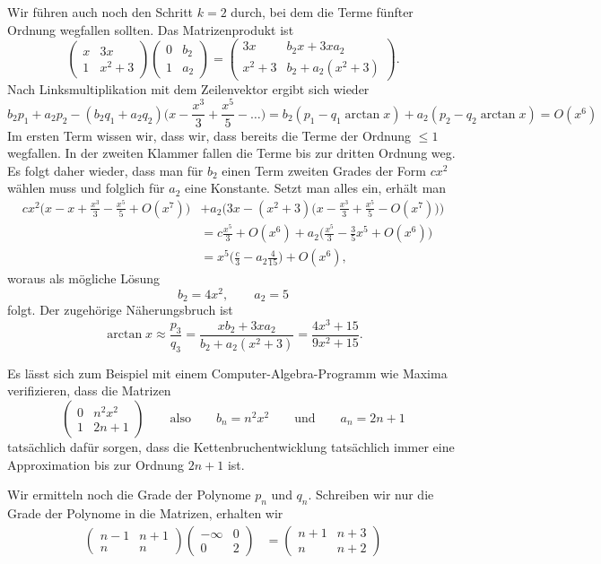 \begin{refsection}
Wir führen auch noch den Schritt $k=2$ durch, bei dem die Terme fünfter
Ordnung wegfallen sollten.
Das Matrizenprodukt ist
\[
\begin{pmatrix}
x&3x\\
1&x^2+3
\end{pmatrix}
\begin{pmatrix}
0&b_2\\
1&a_2
\end{pmatrix}
=
\begin{pmatrix}
3x    & b_2x + 3xa_2 \\
x^2+3 & b_2 + a_2(x^2+3)
\end{pmatrix}.
\]
Nach Linksmultiplikation mit dem Zeilenvektor ergibt sich wieder
\[
b_2p_1 + a_2p_2 - (b_2q_1+a_2q_2)
\biggl(x-\frac{x^3}{3} +\frac{x^5}5-\dots\biggr)
=
b_2(p_1-q_1 \arctan x)
+ a_2(p_2 - q_2\arctan x)
=
O(x^6)
\]
Im ersten Term wissen wir, dass wir, dass bereits die Terme der
Ordnung $\le 1$ wegfallen.
In der zweiten Klammer fallen die Terme bis zur dritten Ordnung weg.
Es folgt daher wieder, dass man für $b_2$ einen Term zweiten Grades
der Form $cx^2$ wählen muss und folglich für $a_2$ eine Konstante.
Setzt man alles ein, erhält man
\begin{align*}
cx^2\biggl(x- x+\frac{x^3}3-\frac{x^5}5+O(x^7)\biggr)
&+
a_2\biggl(3x -(x^2+3)\biggl(x-\frac{x^3}3+\frac{x^5}5-O(x^7)\biggr)\biggr)
\\
&=
c\frac{x^5}{3}
+O(x^6)
+a_2
\biggl(\frac{x^5}{3}-\frac{3}{5}x^5+O(x^6)\biggr)
\\
&=x^5\biggl(\frac{c}3-a_2\frac{4}{15}\biggr) + O(x^6),
\end{align*}
woraus als mögliche Lösung
\[
b_2=4x^2,\qquad
a_2=5
\]
folgt.
Der zugehörige Näherungsbruch ist
\[
\arctan x
\approx
\frac{p_3}{q_3}
=
\frac{xb_2+3xa_2}{b_2+a_2(x^2+3)}
=
\frac{4x^3+15}{9x^2+15}.
\]

Es lässt sich zum Beispiel mit einem Computer-Algebra-Programm wie
Maxima verifizieren, dass die Matrizen
\[
\begin{pmatrix}
0&n^2x^2\\
1&2n+1
\end{pmatrix}
\qquad\text{also}\qquad
b_n=n^2x^2\qquad\text{und}\qquad a_n=2n+1
\]
tatsächlich dafür sorgen, dass die Kettenbruchentwicklung tatsächlich
immer eine Approximation bis zur Ordnung $2n+1$ ist.

Wir ermitteln noch die Grade der Polynome $p_n$ und $q_n$.
Schreiben wir nur die Grade der Polynome in die Matrizen, erhalten wir
\begin{align*}
\begin{pmatrix}
n-1&n+1\\
n  &n
\end{pmatrix}
\begin{pmatrix}
-\infty & 0 \\
    0   & 2
\end{pmatrix}
&=
\begin{pmatrix}
n+1 & n+3 \\
n   & n+2
\end{pmatrix}
\end{align*}


\printbibliography[heading=subbibliography]
\end{refsection}
